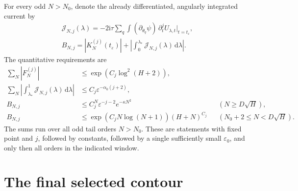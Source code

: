 \documentclass[11pt]{article}
\numberwithin{equation}{section}
\theoremstyle{definition}
\newcommand{\dd}{\,\mathrm d}
\newcommand{\ii}{\mathrm i}
\newcommand{\eps}{\varepsilon}
\begin{document}
For every odd $N>N_0$, denote the already differentiated,
angularly integrated current by
\begin{gather*}
 \mathcal J_{N,j}(\lambda)
   =-2\ii\tau\sum_q\int(\partial_{\theta_q}\psi)\,
              \partial_t^j U_{\lambda,t}\big|_{t=t_\eps},\\
 B_{N,j}=|K_N^{(j)}(t_\eps)|
       +\left|\int_0^{\lambda_*}\mathcal J_{N,j}(\lambda)\dd\lambda\right|.
\end{gather*}
The quantitative requirements are
\begin{align}
 \sum_N|F_N^{(j)}|
   &\le \exp(C_j\log^2(H+2)),\label{eq:reqF}\\
 \sum_N\left|\int_{\lambda_*}^1
               \mathcal J_{N,j}(\lambda)\dd\lambda\right|
   &\le C_j\eps^{-\alpha_0(j+2)},\label{eq:reqLS}\\
 B_{N,j}
   &\le C_j^N\eps^{-j-2}e^{-\kappa N^2}
             &&(N\ge D\sqrt H),\label{eq:reqhigh}\\
 B_{N,j}
   &\le \exp(C_jN\log(N+1))(H+N)^{C_j}
             &&(N_0+2\le N<D\sqrt H).\label{eq:reqinter}
\end{align}
The sums run over all odd tail orders \(N>N_0\).
These are statements with fixed point and \(j\), followed by constants,
followed by a single sufficiently small \(\eps_0\), and only then all
orders in the indicated window.



\section{The final selected contour}
\label{sec:F}
\end{document}
